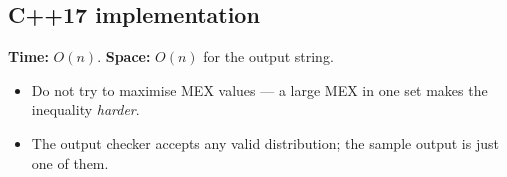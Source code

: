 
\subsection*{C++17 implementation}

\begin{complexitybox}
\textbf{Time:} $O(n)$. \textbf{Space:} $O(n)$ for the output string.
\end{complexitybox}

\begin{pitfallbox}
\begin{itemize}
  \item Do not try to maximise MEX values --- a large MEX in one set makes
        the inequality \emph{harder}.
  \item The output checker accepts any valid distribution; the sample output
        is just one of them.
\end{itemize}
\end{pitfallbox}
